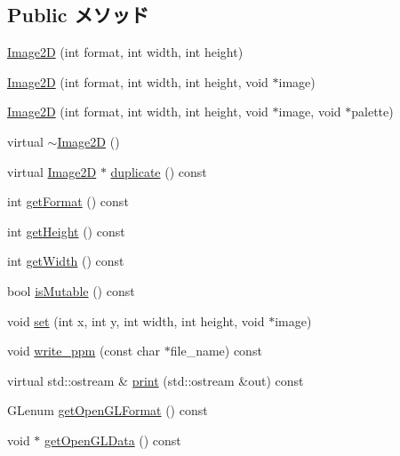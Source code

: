 \subsection*{Public メソッド}
\begin{CompactItemize}
\item 
\hyperlink{classm3g_1_1Image2D_cea21be298c6584490d2b714c4b29d6b}{Image2D} (int format, int width, int height)
\item 
\hyperlink{classm3g_1_1Image2D_8cf9a47f24ed50fe66686c1117fb048c}{Image2D} (int format, int width, int height, void $\ast$image)
\item 
\hyperlink{classm3g_1_1Image2D_f498914ceac20ff9b1708c55ff1484e6}{Image2D} (int format, int width, int height, void $\ast$image, void $\ast$palette)
\item 
virtual \hyperlink{classm3g_1_1Image2D_7ac703fe7edbb053dd2246ea1bb43200}{$\sim$Image2D} ()
\item 
virtual \hyperlink{classm3g_1_1Image2D}{Image2D} $\ast$ \hyperlink{classm3g_1_1Image2D_47eefc8e0b0b3d4c5b16b3f57285fe6b}{duplicate} () const 
\item 
int \hyperlink{classm3g_1_1Image2D_c08e2752176d267cc4429d4d185975b8}{getFormat} () const 
\item 
int \hyperlink{classm3g_1_1Image2D_317329daf960a1759801c0f16d43d5a3}{getHeight} () const 
\item 
int \hyperlink{classm3g_1_1Image2D_f149cb053bc8b5fbc1364b5dbb934488}{getWidth} () const 
\item 
bool \hyperlink{classm3g_1_1Image2D_d687aabba553d1c66bfc253ec7e5bd05}{isMutable} () const 
\item 
void \hyperlink{classm3g_1_1Image2D_fe9ef1abefb9e92b38687e27c9004bdc}{set} (int x, int y, int width, int height, void $\ast$image)
\item 
void \hyperlink{classm3g_1_1Image2D_32ee5b2bcc9c7bf69b925413eeccb4bf}{write\_\-ppm} (const char $\ast$file\_\-name) const 
\item 
virtual std::ostream \& \hyperlink{classm3g_1_1Image2D_6fea17fa1532df3794f8cb39cb4f911f}{print} (std::ostream \&out) const 
\item 
GLenum \hyperlink{classm3g_1_1Image2D_7923da2fe82fee768ec9937a693e843c}{getOpenGLFormat} () const 
\item 
void $\ast$ \hyperlink{classm3g_1_1Image2D_b837b1bdda59947a6d818c448965c502}{getOpenGLData} () const 
\end{CompactItemize}
